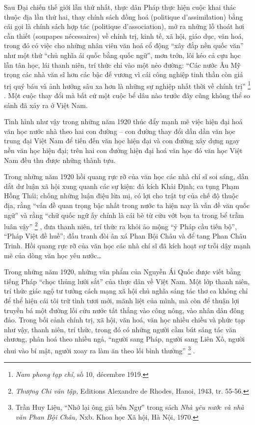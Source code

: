 \documentclass[../main.tex]{subfiles}
\begin{document}
\begin{multicols}{2}

Sau Đại chiến thế giới lần thứ nhất, thực dân Pháp thực hiện cuộc khai thác thuộc địa lần thứ hai, thay chính sách đồng hoá (politique d’assimilation) bằng cái gọi là chính sách hợp tác (politique d’association), mở ra những lỗ thoát hơi cần thiết (soupapes nécessaires) về chính trị, kinh tế, xã hội, giáo dục, văn hoá, trong đó có việc cho những nhân viên văn hoá cổ động “xây đắp nền quốc văn” như một thứ “chủ nghĩa ái quốc bằng quốc ngữ”, mơn trớn, lôi kéo cả cựu học lẫn tân học, lái thanh niên, trí thức chỉ vào một nẻo đường: “Các nước Âu Mỹ trọng các nhà văn sĩ hơn các bậc đế vương vì cái công nghiệp tinh thần còn giá trị quý báu và ảnh hưởng sâu xa hơn là những sự nghiệp nhất thời về chính trị” \footnote{
\textit{Nam phong tạp chí, }số 10, décembre 1919.} . Một cuộc thay đổi mà bất cứ một cuộc bể dâu nào trước đây cũng không thể so sánh đã xảy ra ở Việt Nam. 
 
Tình hình như vậy trong những năm 1920 thúc đẩy mạnh mẽ việc hiện đại hoá văn học nước nhà theo hai con đường – con đường thay đổi dần dần văn học trung đại Việt Nam để tiến đến văn học hiện đại và con đường xây dựng ngay nền văn học hiện đại; trên hai con đường hiện đại hoá văn học đó văn học Việt Nam đều thu được những thành tựu. 
 
Trong những năm 1920 hồi quang rực rỡ của văn học các nhà chí sĩ soi sáng, dẫn dắt dư luận xã hội xung quanh các sự kiện: đả kích Khải Định; ca tụng Phạm Hồng Thái; chống những luận điệu lừa mị, có lợi cho trật tự của chế độ thuộc địa, rằng “vấn đề quan trọng bậc nhất trong nước ta hiện nay là vấn đề văn quốc ngữ” và rằng “chữ quốc ngữ ấy chính là cái bè từ cứu vớt bọn ta trong bể trầm luân vậy” \footnote{
\textit{Thượng Chi văn tập, }Editions Alexandre de Rhodes, Hanoi, 1943, tr. 55-56.} , đưa thanh niên, trí thức ra khỏi ảo mộng “ỷ Pháp cầu tiến bộ”, “Pháp Việt đề huề”; đấu tranh đòi ân xá Phan Bội Châu và để tang Phan Châu Trinh. Hồi quang rực rỡ của văn học các nhà chí sĩ đã kích hoạt sự trỗi dậy mạnh mẽ của dòng văn học yêu nước… 
 
Trong những năm 1920, những văn phẩm của Nguyễn Ái Quốc được viết bằng tiếng Pháp “chọc thủng lưới sắt” của thực dân về Việt Nam. Một lớp thanh niên, trí thức giác ngộ tư tưởng cách mạng xã hội chủ nghĩa sáng tác thơ ca không chỉ để thể hiện cái tôi trữ tình tươi mới, mãnh liệt của mình, mà còn để thuận lợi truyền bá một đường lối cứu nước tất thắng vào công nông, vào nhân dân đông đảo. Trong bối cảnh chính trị, xã hội, văn hoá, văn học nhiều chiều và phức tạp như vậy, thanh niên, trí thức, trong đó có những người cầm bút sáng tác văn chương, phân hoá theo nhiều ngả, “người sang Pháp, người sang Liên Xô, người chui vào bí mật, người xoay ra làm ăn theo lối bình thường” \footnote{
Trần Huy Liệu, “Nhớ lại ông già bến Ngự” trong sách\textit{ Nhà yêu nước và nhà văn Phan Bội Châu, }Nxb. Khoa học Xã hội, Hà Nội, 1970.} . 
 

\end{multicols}
\end{document}
